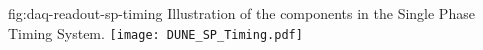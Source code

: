 \begin{dunefigure}{fig:daq-readout-sp-timing}
  {Illustration of the components in the Single Phase Timing System.}
  \texttt{[image: DUNE\_SP\_Timing.pdf]}
\end{dunefigure}


